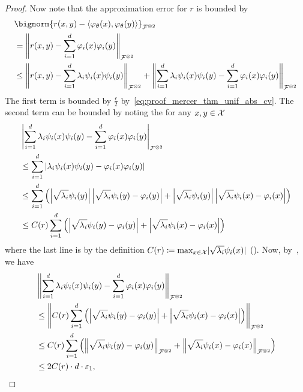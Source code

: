 \begin{proof}
	Now note that the approximation error for $r$ is bounded by
	\begin{equation}\label{eq:proof_approx_bound}
		\begin{split}
			&\bignorm{r(x,y) - \langle \phi_\theta(x), \phi_\theta(y) \rangle}_{\calF^{\otimes 2}}\\
			&= \norm{ r(x,y) - \sum_{i=1}^{d}{\phi_i(x) \phi_i(y)}}_{\calF^{\otimes 2}} \\
			&\leq \norm{ r(x,y) - \sum_{i=1}^{d}{\lambda_i \psi_i(x) \psi_i(y)}}_{\calF^{\otimes 2}} + \norm{\sum_{i=1}^{d}\lambda_i \psi_i(x) \psi_i(y) - \sum_{i=1}^{d}\phi_i(x) \phi_i(y)}_{\calF^{\otimes 2}}
		\end{split}
	\end{equation}
	The first term is bounded by $\frac{\epsilon}{2}$ by~\eqref{eq:proof_mercer_thm_unif_abs_cv}. The second term can be bounded by noting the for any $x, y \in {\mathcal{X}}$
	\begin{equation*}
		\begin{split}
			&\abs{\sum_{i=1}^{d}\lambda_i \psi_i(x) \psi_i(y) - \sum_{i=1}^{d}\phi_i(x) \phi_i(y)}_{\calF^{\otimes 2}}  \\
			&\leq \sum_{i=1}^{d}{ \abs{ \lambda_i \psi_i(x) \psi_i(y) - \phi_i(x) \phi_i(y)}} \\
			&\leq \sum_{i=1}^{d}{\paren{
				\abs{\sqrt{\lambda_i} \psi_i(y)} \abs{\sqrt{\lambda_i} \psi_i(y) - \phi_i(y)}
				+ \abs{\sqrt{\lambda_i} \psi_i(y)} \abs{\sqrt{\lambda_i} \psi_i(x) - \phi_i(x)}
				}} \\
			&\leq C(r) \sum_{i=1}^{d}{\paren{
				\abs{\sqrt{\lambda_i} \psi_i(y) - \phi_i(y)}
				+ \abs{\sqrt{\lambda_i} \psi_i(x) - \phi_i(x)}
				}} \\
		\end{split}
	\end{equation*}
	where the last line is by the definition $C(r) \coloneqq \max_{x \in {\mathcal{X}}} \lvert \sqrt{\lambda_i} \psi_i(x) \rvert$ (). Now, by~, we have
	\begin{align*}
		&\norm{\sum_{i=1}^{d}\lambda_i \psi_i(x) \psi_i(y) - \sum_{i=1}^{d}\phi_i(x) \phi_i(y)}_{\calF^{\otimes 2}} \\
		&\leq \norm{C(r) \sum_{i=1}^{d}{\paren{\abs{\sqrt{\lambda_i} \psi_i(y) - \phi_i(y)} + \abs{\sqrt{\lambda_i} \psi_i(x) - \phi_i(x)}}}}_{\calF^{\otimes 2}}\\
		&\leq C(r) \sum_{i=1}^{d}\paren{\norm{\sqrt{\lambda_i} \psi_i(y) - \phi_i(y)}_{\calF^{\otimes 2}} + \norm{\sqrt{\lambda_i} \psi_i(x) - \phi_i(x)}_{\calF^{\otimes 2}}}\\
		&\leq 2 C(r) \cdot d \cdot \epsilon_1,
	\end{align*}


\end{proof}
